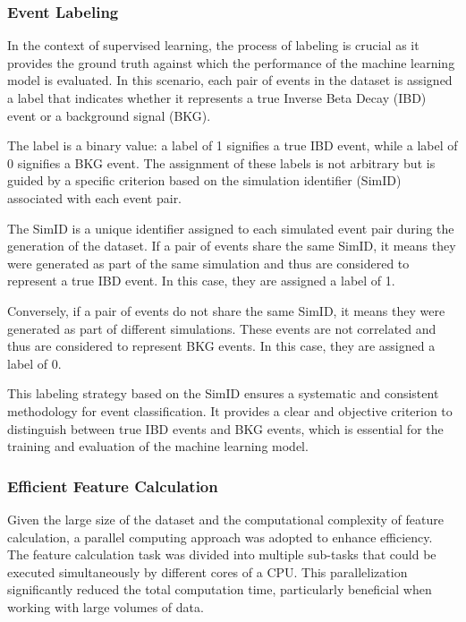 \subsubsection*{Event Labeling}

In the context of supervised learning, the process of labeling is crucial as it provides the ground truth against which the performance of the machine learning model is evaluated. In this scenario, each pair of events in the dataset is assigned a label that indicates whether it represents a true Inverse Beta Decay (IBD) event or a background signal (BKG).

The label is a binary value: a label of 1 signifies a true IBD event, while a label of 0 signifies a BKG event. The assignment of these labels is not arbitrary but is guided by a specific criterion based on the simulation identifier (SimID) associated with each event pair.

The SimID is a unique identifier assigned to each simulated event pair during the generation of the dataset. If a pair of events share the same SimID, it means they were generated as part of the same simulation and thus are considered to represent a true IBD event. In this case, they are assigned a label of 1.

Conversely, if a pair of events do not share the same SimID, it means they were generated as part of different simulations. These events are not correlated and thus are considered to represent BKG events. In this case, they are assigned a label of 0.

This labeling strategy based on the SimID ensures a systematic and consistent methodology for event classification. It provides a clear and objective criterion to distinguish between true IBD events and BKG events, which is essential for the training and evaluation of the machine learning model.


\subsubsection*{Efficient Feature Calculation}
Given the large size of the dataset and the computational complexity of feature calculation, a parallel computing approach was adopted to enhance efficiency. The feature calculation task was divided into multiple sub-tasks that could be executed simultaneously by different cores of a CPU. This parallelization significantly reduced the total computation time, particularly beneficial when working with large volumes of data.


